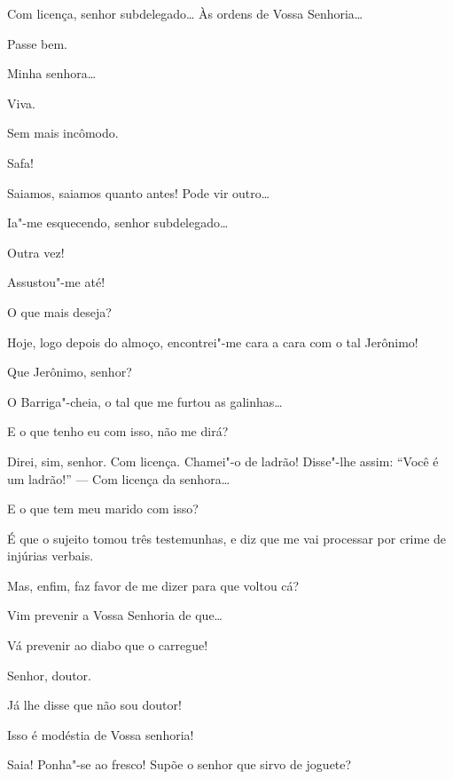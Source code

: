  Com licença, senhor subdelegado\ldots{} Às ordens de Vossa
Senhoria\ldots{}

 Passe bem.

 Minha senhora\ldots{}

 Viva. 

 Sem mais incômodo. 

 Safa!

 Saiamos, saiamos quanto antes! Pode vir outro\ldots{} 

  Ia"-me esquecendo, senhor
subdelegado\ldots{}

 Outra vez!

 Assustou"-me até!

 O que mais deseja?

 Hoje, logo depois do almoço, encontrei"-me cara a cara com o
tal Jerônimo!

 Que Jerônimo, senhor?

 O Barriga"-cheia, o tal que me furtou as galinhas\ldots{}

 E o que tenho eu com isso, não me dirá?

 Direi, sim, senhor. Com licença.  Chamei"-o de ladrão! Disse"-lhe assim: “Você é um ladrão!” --- Com licença da senhora\ldots{}

 E o que tem meu marido com isso?

 É que o sujeito tomou três testemunhas, e diz que me vai
processar por crime de injúrias verbais.

 Mas, enfim, faz favor de me dizer para que voltou cá?

 Vim prevenir a Vossa Senhoria de que\ldots{}

 Vá prevenir ao diabo que o carregue!

  Senhor, doutor.

  Já lhe disse que não sou doutor!

  Isso é modéstia de Vossa senhoria!

 Saia! Ponha"-se ao fresco! Supõe o senhor que sirvo de joguete?

